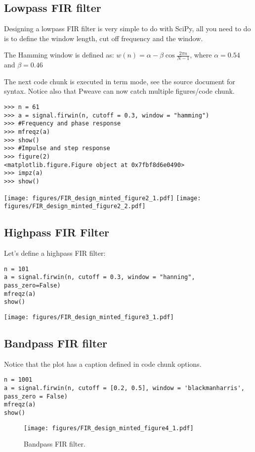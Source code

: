 \documentclass[a4paper,11pt,final]{article}
\begin{document}
\subsection{Lowpass FIR filter}

Designing a lowpass FIR filter is very simple to do with SciPy, all you
need to do is to define the window length, cut off frequency and the
window.

The Hamming window is defined as:
$w(n) = \alpha - \beta\cos\frac{2\pi n}{N-1}$, where $\alpha=0.54$ and
$\beta=0.46$

The next code chunk is executed in term mode, see the source document
for syntax. Notice also that Pweave can now catch multiple
figures/code chunk.


\begin{verbatim}
>>> n = 61
>>> a = signal.firwin(n, cutoff = 0.3, window = "hamming")
>>> #Frequency and phase response
>>> mfreqz(a)
>>> show()
>>> #Impulse and step response
>>> figure(2)
<matplotlib.figure.Figure object at 0x7fbf8d6e0490>
>>> impz(a)
>>> show()

\end{verbatim}
\texttt{[image: figures/FIR\_design\_minted\_figure2\_1.pdf]}
\texttt{[image: figures/FIR\_design\_minted\_figure2\_2.pdf]}


\subsection{Highpass FIR Filter}

Let's define a highpass FIR filter:


\begin{verbatim}
n = 101
a = signal.firwin(n, cutoff = 0.3, window = "hanning",
pass_zero=False)
mfreqz(a)
show()
\end{verbatim}
\texttt{[image: figures/FIR\_design\_minted\_figure3\_1.pdf]}


\subsection{Bandpass FIR filter}

Notice that the plot has a caption defined in code chunk options.



\begin{verbatim}
n = 1001
a = signal.firwin(n, cutoff = [0.2, 0.5], window = 'blackmanharris',
pass_zero = False)
mfreqz(a)
show()
\end{verbatim}
\begin{figure}[htpb]
\center
\texttt{[image: figures/FIR\_design\_minted\_figure4\_1.pdf]}
\caption{Bandpass FIR filter.}
\label{fig:None}
\end{figure}
\end{document}
